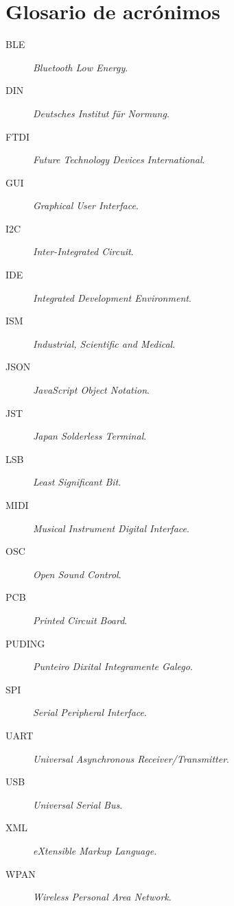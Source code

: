 \chapter{Glosario de acrónimos}
\label{chap:glosario-acronimos}


\begin{description}
 \item [BLE] \emph{Bluetooth Low Energy}.
 \item [DIN] \emph{Deutsches Institut für Normung}.
 \item [FTDI] \emph{Future Technology Devices International}.
 \item [GUI] \emph{Graphical User Interface}.
 \item [I2C] \emph{Inter-Integrated Circuit}.
 \item [IDE] \emph{Integrated Development Environment}.
 \item [ISM] \emph{Industrial, Scientific and Medical}.
 \item [JSON] \emph{JavaScript Object Notation}.
 \item [JST] \emph{Japan Solderless Terminal}.
 \item [LSB] \emph{Least Significant Bit}.
 \item [MIDI] \emph{Musical Instrument Digital Interface}.
 \item [OSC] \emph{Open Sound Control}.
 \item [PCB] \emph{Printed Circuit Board}.
 \item [PUDING] \emph{Punteiro Dixital Integramente Galego}.
 \item [SPI] \emph{Serial Peripheral Interface}.
 \item [UART] \emph{Universal Asynchronous Receiver/Transmitter}.
 \item [USB] \emph{Universal Serial Bus}.
 \item [XML] \emph{eXtensible Markup Language}.
 \item [WPAN] \emph{Wireless Personal Area Network}.
\end{description}

